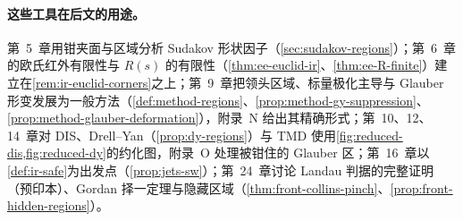 \paragraph{这些工具在后文的用途。}
第~5~章用钳夹面与区域分析 Sudakov 形状因子（\cref{sec:sudakov-regions}）；第~6~章的欧氏红外有限性与 $R(s)$ 的有限性（\cref{thm:ee-euclid-ir}、\cref{thm:ee-R-finite}）建立在\cref{rem:ir-euclid-corners}之上；第~9~章把领头区域、标量极化主导与 Glauber 形变发展为一般方法（\cref{def:method-regions}、\cref{prop:method-gy-suppression}、\cref{prop:method-glauber-deformation}），附录~N 给出其精确形式；第~10、12、14~章对 DIS、Drell--Yan（\cref{prop:dy-regions}）与 TMD 使用\cref{fig:reduced-dis,fig:reduced-dy}的约化图，附录~O 处理被钳住的 Glauber 区；第~16~章以\cref{def:ir-safe}为出发点（\cref{prop:jets-sw}）；第~24~章讨论 Landau 判据的完整证明（预印本）、Gordan 择一定理与隐藏区域（\cref{thm:front-collins-pinch}、\cref{prop:front-hidden-regions}）。
